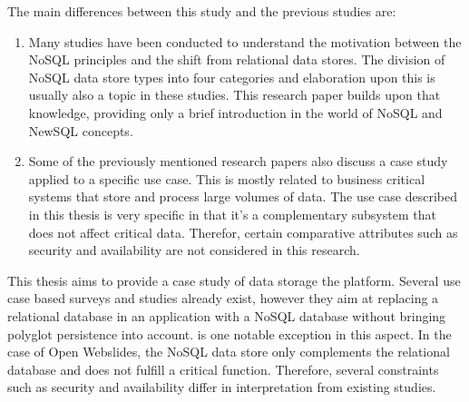
The main differences between this study and the previous studies are:

\begin{enumerate}
  \item Many studies have been conducted to understand the motivation between the NoSQL principles and the shift from relational data stores. The division of NoSQL data store types into four categories and elaboration upon this is usually also a topic in these studies. This research paper builds upon that knowledge, providing only a brief introduction in the world of NoSQL and NewSQL concepts.
  \item Some of the previously mentioned research papers also discuss a case study applied to a specific use case. This is mostly related to business critical systems that store and process large volumes of data. The use case described in this thesis is very specific in that it's a complementary subsystem that does not affect critical data. Therefor, certain comparative attributes such as security and availability are not considered in this research.
\end{enumerate}


This thesis aims to provide a case study of data storage the \textcite{OpenWebslides2017} platform. Several use case based surveys and studies already exist, however they aim at replacing a relational database in an application with a NoSQL database without bringing polyglot persistence into account. \textcite{Sadalage2012} is one notable exception in this aspect. In the case of Open Webslides, the NoSQL data store only complements the relational database and does not fulfill a critical function. Therefore, several constraints such as security and availability differ in interpretation from existing studies.
